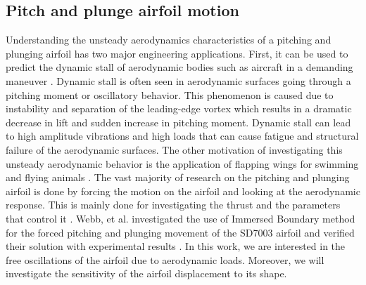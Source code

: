 \subsection{Pitch and plunge airfoil motion}
Understanding the unsteady aerodynamics characteristics of a pitching and plunging airfoil has two major engineering applications. First, it can be used to predict the dynamic stall of aerodynamic bodies such as aircraft in a demanding maneuver \cite{tuncer1998computational}. Dynamic stall is often seen in aerodynamic surfaces going through a pitching moment or oscillatory behavior. This phenomenon is caused due to instability and separation of the leading-edge vortex which results in a dramatic decrease in lift and sudden increase in pitching moment. Dynamic stall can lead to high amplitude vibrations and high loads that can cause fatigue and structural failure of the aerodynamic surfaces. The other motivation of investigating this unsteady aerodynamic behavior is the application of flapping wings for swimming and flying animals \cite{shyy2008computational}. The vast majority of research on the pitching and plunging airfoil is done by forcing the motion on the airfoil and looking at the aerodynamic response. This is mainly done for investigating the thrust and the parameters that control it \cite{tuncer2000computational, lian2008comparative}. Webb, et al. investigated the use of Immersed Boundary method for the forced pitching and plunging movement of the SD7003 airfoil and verified their solution with experimental results \cite{webb2008effects}. In this work, we are interested in the free oscillations of the airfoil due to aerodynamic loads. Moreover, we will investigate the sensitivity of the airfoil displacement to its shape.

